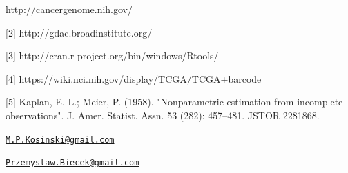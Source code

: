 \newpage

\begin{Schunk}
\begin{Sinput}
[1] http://cancergenome.nih.gov/

[2] http://gdac.broadinstitute.org/
   
[3] http://cran.r-project.org/bin/windows/Rtools/
   
[4] https://wiki.nci.nih.gov/display/TCGA/TCGA+barcode

[5]  Kaplan, E. L.; Meier, P. (1958). "Nonparametric estimation from incomplete observations". J. Amer. Statist. Assn. 53 (282): 457–481. JSTOR 2281868.


\end{Sinput}
\end{Schunk}

\address{
Marcin Kosinski\\
Warsaw University of Technology\\
Faculty of Mathematics and Information Science\\ Koszykowa 75, 00-662 Warsaw, Poland\\
}
\href{mailto:M.P.Kosinski@gmail.com}{\nolinkurl{M.P.Kosinski@gmail.com}}

\address{
Przemysław Biecek\\
University of Warsaw\\
Faculty of Mathematics, Informatics, and Mechanics\\ Banacha 2, 02-097 Warsaw, Poland\\
}
\href{mailto:Przemyslaw.Biecek@gmail.com}{\nolinkurl{Przemyslaw.Biecek@gmail.com}}

